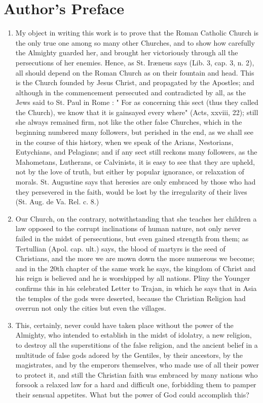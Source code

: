 \documentclass[12pt]{book}
\begin{document}
\chapter*{Author's Preface}
\begin{enumerate}
\item My object in writing this work is to prove that the Roman Catholic Church is the only true one among
so many other Churches, and to show how carefully the Almighty guarded her, and brought her
victoriously through all the persecutions of her enemies. Hence, as St. Ir{\ae}neus says (Lib. 3, cap. 3, n. 2), all
should depend on the Roman Church as on their fountain and head. This is the Church founded by Jesus
Christ, and propagated by the Apostles; and although in the commencement persecuted and contradicted
by all, as the Jews said to St. Paul in Rome : " For as concerning this sect (thus they called the Church), we
know that it is gainsayed every where" (Acts, xxviii, 22); still she always remained firm, not like the other
false Churches, which in the beginning numbered many followers, but perished in the end, as we shall
see in the course of this history, when we speak of the Arians, Nestorians, Eutychians, and Pelagians; and
if any sect still reckons many followers, as the Mahometans, Lutherans, or Calvinists, it is easy to see that
they are upheld, not by the love of truth, but either by popular ignorance, or relaxation of morals. St.
Augustine says that heresies are only embraced by those who had they persevered in the faith, would be
lost by the irregularity of their lives (St. Aug. de Va. Rel. c. 8.)

\item Our Church, on the contrary, notwithstanding that she teaches her children a law opposed to the
corrupt inclinations of human nature, not only never failed in the midst of persecutions, but even gained
strength from them; as Tertullian (Apol. cap. ult.) says, the blood of martyrs is the seed of Christians, and
the more we are mown down the more numerous we become; and in the 20th chapter of the same work
he says, the kingdom of Christ and his reign is believed and he is worshipped by all nations. Pliny the
Younger confirms this in his celebrated Letter to Trajan, in which he says that in Asia the temples of the
gods were deserted, because the Christian Religion had overrun not only the cities but even the villages.

\item This, certainly, never could have taken place without the power of the Almighty, who intended to
establish in the midst of idolatry, a new religion, to destroy all the superstitions of the false religion, and
the ancient belief in a multitude of false gods adored by the Gentiles, by their ancestors, by the
magistrates, and by the emperors themselves, who made use of all their power to protect it, and still the
Christian faith was embraced by many nations who forsook a relaxed law for a hard and difficult one,
forbidding them to pamper their sensual appetites. What but the power of God could accomplish this?


\end{enumerate}
\end{document}
